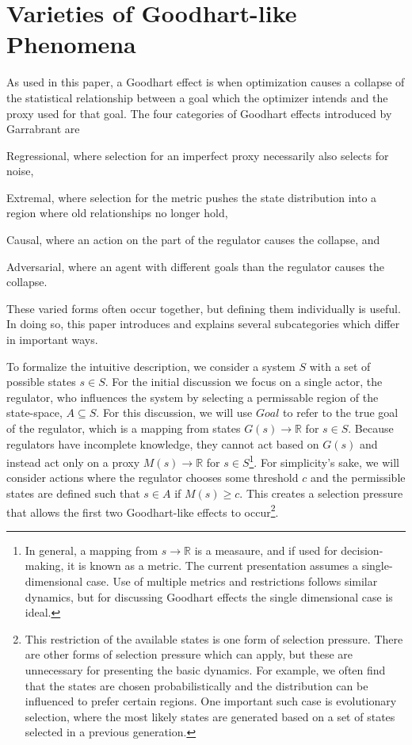 \documentclass[10pt]{article}
\begin{document}
\section*{Varieties of Goodhart-like Phenomena}

As used in this paper, a Goodhart effect is when optimization causes a collapse of the statistical relationship between a goal which the optimizer intends and the proxy used for that goal. The four categories of Goodhart effects introduced by Garrabrant are \begin{enumerate*} [1) ]%
\item Regressional, where selection for an imperfect proxy necessarily also selects for noise, \item Extremal, where selection for the metric pushes the state distribution into a region where old relationships no longer hold, \item Causal, where an action on the part of the regulator causes the collapse, and \item Adversarial, where an agent with different goals than the regulator causes the collapse.\end{enumerate*} These varied forms often occur together, but defining them individually is useful. In doing so, this paper introduces and explains several subcategories which differ in important ways.

To formalize the intuitive description, we consider a system $S$ with a set of possible states $s \in S$. For the initial discussion we focus on a single actor, the regulator, who influences the system by selecting a permissable region of the state-space, $A\subseteq S$. For this discussion, we will use $Goal$ to refer to the true goal of the regulator, which is a mapping from states $G(s)\to \mathbb{R}$ for $ s \in S $. Because regulators have incomplete knowledge, they cannot act based on $G(s)$ and instead act only on a proxy $M(s) \to \mathbb{R}$ for $s \in S$\footnote{In general, a mapping from $s\to \mathbb{R}$ is a measaure, and if used for decision-making, it is known as a metric. The current presentation assumes a single-dimensional case. Use of multiple metrics and restrictions follows similar dynamics, but for discussing Goodhart effects the single dimensional case is ideal.}. 
For simplicity's sake, we will consider actions where the regulator chooses some threshold $c$ and the permissible states are defined such that $s \in A$ if $M(s) \geq c$. This creates a selection pressure that allows the first two Goodhart-like effects to occur\footnote{This restriction of the available states is one form of selection pressure. There are other forms of selection pressure which can apply, but these are unnecessary for presenting the basic dynamics. For example, we often find that the states are chosen probabilistically and the distribution can be influenced to prefer certain regions. One important such case is evolutionary selection, where the most likely states are generated based on a set of states selected in a previous generation.}.
\end{document}
